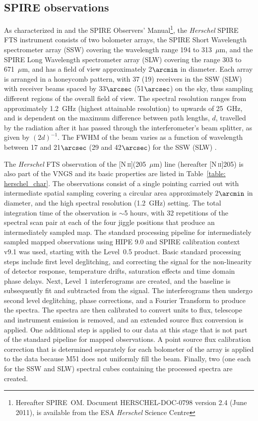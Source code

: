 \documentclass[preprint2]{aastex}
\begin{document}
\subsection{SPIRE observations}\label{spire_obs}
As characterized in \citet{2010A&A...518L...3G} and the SPIRE Observers' Manual\footnote{Hereafter SPIRE~OM.  Document HERSCHEL-DOC-0798 version 2.4 (June 2011), is available from the ESA \emph{Herschel} Science Centre}, the \emph{Herschel} SPIRE FTS instrument consists of two bolometer arrays, the SPIRE Short Wavelength spectrometer array (SSW) covering the wavelength range 194 to 313~$\mu$m, and the SPIRE Long Wavelength spectrometer array (SLW) covering the range 303 to 671~$\mu$m, and has a field of view approximately 2$\arcmin$ in diameter.  Each array is arranged in a honeycomb pattern, with 37 (19) receivers in the SSW (SLW) with receiver beams spaced by 33$\arcsec$ (51$\arcsec$) on the sky, thus sampling different regions of the overall field of view. The spectral resolution ranges from approximately 1.2~GHz (highest attainable resolution) to upwards of 25~GHz, and is dependent on the maximum difference between path lengths, $d$, travelled by the radiation after it has passed through the interferometer's beam splitter, as given by $(2d)^{-1}$.  The FWHM of the beam varies as a function of wavelength between 17 and 21$\arcsec$ (29 and 42$\arcsec$) for the SSW (SLW) \citep{2010A&A...518L...3G,2010A&A...518L...4S}.

The \emph{Herschel} FTS observation of the [N\,\textsc{ii}](205~$\mu$m) line (hereafter [N\,\textsc{ii}]205) is also part of the VNGS and its basic properties are listed in Table~\ref{table: herschel_char}.  The observations consist of a single pointing carried out with intermediate spatial sampling covering a circular area approximately 2$\arcmin$ in diameter, and the high spectral resolution (1.2~GHz) setting. The total integration time of the observation is $\sim$5 hours, with 32 repetitions of the spectral scan pair at each of the four jiggle positions that produce an intermediately sampled map.  The standard processing pipeline for intermediately sampled mapped observations using HIPE 9.0 and SPIRE calibration context v9.1 was used, starting with the Level~0.5 product.   Basic standard processing steps include first level deglitching, and correcting the signal for the non-linearity of detector response, temperature drifts, saturation effects and time domain phase delays.  Next, Level~1 interferograms are created, and the baseline is subsequently fit and subtracted from the signal.  The interferograms then undergo second level deglitching, phase corrections, and a Fourier Transform to produce the spectra.  The spectra are then calibrated to convert units to flux, telescope and instrument emission is removed, and an extended source flux conversion is applied.  One additional step is applied to our data at this stage that is not part of the standard pipeline for mapped observations.  A point source flux calibration correction that is determined separately for each bolometer of the array is applied to the data because M51 does not uniformly fill the beam.  Finally, two (one each for the SSW and SLW) spectral cubes containing the processed spectra are created.
\end{document}
